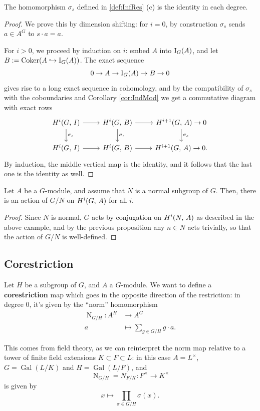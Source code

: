 \documentclass[a4paper, oneside]{memoir}
\begin{document}
\begin{proposition}\label{prop:ConjId}
	The homomorphism $\sigma_s$ defined in \ref{def:InfRes} (c)	is the identity in each degree.
\end{proposition}
\begin{proof}
	We prove this by dimension shifting: for $i=0$, by construction $\sigma_s$ sends $a\in A^G$ to $s\cdot a=a$.

	For $i>0$, we proceed by induction on $i$: embed $A$ into $\operatorname{I}_{G}(A)$, and let $B:=\operatorname{Coker}(A\hookrightarrow \operatorname{I}_{G}(A))$. The exact sequence
	\[
		0\to A\to \operatorname{I}_{G}(A)\to B\to 0
	\]
	gives rise to a long exact sequence in cohomology, and by the compatibility of $\sigma_s$ with the coboundaries and Corollary \ref{cor:IndMod} we get a commutative diagram with exact rows
	\[
		\begin{tikzcd}
			\H{i}{G}{I} \arrow[r] \arrow[d, "\sigma_s"] & \H{i}{G}{B} \arrow[r] \arrow[d, "\sigma_s"] & \H{i+1}{G}{A} \arrow[d, "\sigma_s"] \to 0 \\
			\H{i}{G}{I} \arrow[r]                        & \H{i}{G}{B} \arrow[r]                        & \H{i+1}{G}{A} \to 0.
		\end{tikzcd}
	\]
	By induction, the middle vertical map is the identity, and it follows that the last one is the identity as well.
\end{proof}

\begin{corollary}\label{cor:NormalAction}
	Let $A$ be a $G$-module, and assume that $N$ is a normal subgroup of $G$. Then, there is an action of $G / N$ on $H^{i}( G, \, A )$ for all $i$.
\end{corollary}

\begin{proof}
	Since $N$ is normal, $G$ acts by conjugation on $H^{i}( N, \, A )$ as described in the above example, and by the previous proposition any $n\in N$ acts trivially, so that the action of $G/N$ is well-defined.
\end{proof}

\subsection{Corestriction}

Let $H$ be a subgroup of $G$, and $A$ a $G$-module. We want to define a \textbf{corestriction} map which goes in the opposite direction of the restriction: in degree $0$, it's given by the ``norm'' homomorphism
\begin{align*}
	\operatorname{N}_{G/H}: A^H & \longrightarrow A^G                   \\
	a                           & \longmapsto \sum_{g\in G/H} g\cdot a.
\end{align*}
\begin{remark}
	This comes from field theory, as we can reinterpret the norm map relative to a tower of finite field extensions $K\subset F\subset L$: in this case $A=L^\times$, $G=\operatorname{Gal}{(L/K)}$ and $H=\operatorname{Gal}{(L/F)}$, and \[\operatorname{N}_{G/H}=N_{F/K}: F^\times\to K^\times\] is given by \[x\mapsto\prod_{\sigma\in G/H} \sigma(x).\]
\end{remark}
\end{document}
